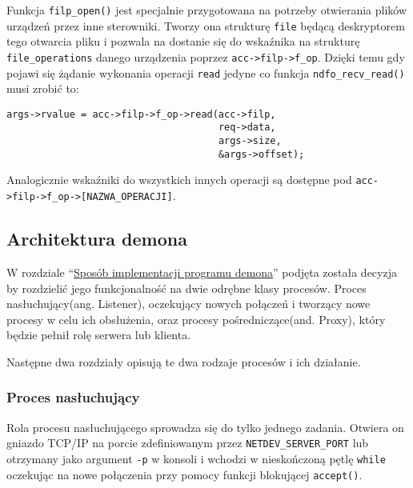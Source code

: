 \documentclass[10pt]{article}
\begin{document}
Funkcja \texttt{filp\_open()} jest specjalnie przygotowana na potrzeby otwierania plików urządzeń przez inne sterowniki. Tworzy ona strukturę \texttt{file} będącą deskryptorem tego otwarcia pliku i pozwala na dostanie się do wskaźnika na strukturę \texttt{file\_operations} danego urządzenia poprzez \texttt{acc-\textgreater{}filp-\textgreater{}f\_op}.  Dzięki temu gdy pojawi się żądanie wykonania operacji \texttt{read} jedyne co funkcja \texttt{ndfo\_recv\_read()} musi zrobić to:

\begin{verbatim}
args->rvalue = acc->filp->f_op->read(acc->filp,
                                     req->data,
                                     args->size,
                                     &args->offset);
\end{verbatim}

Analogicznie wskaźniki do wszystkich innych operacji są dostępne pod \texttt{acc-\textgreater{}filp-\textgreater{}f\_op-\textgreater{}{[}NAZWA\_OPERACJI{]}}.

\subsection{Architektura demona}

W rozdziale ``\hyperref[sposób-implementacji-programu-demona]{Sposób implementacji programu demona}'' podjęta została decyzja by rozdzielić jego funkcjonalność na dwie odrębne klasy procesów. Proces nasłuchujący(ang. Listener), oczekujący nowych połączeń i tworzący nowe procesy w celu ich obsłużenia, oraz procesy pośredniczące(and. Proxy), który będzie pełnił rolę serwera lub klienta.

Następne dwa rozdziały opisują te dwa rodzaje procesów i ich działanie.

\subsubsection{Proces nasłuchujący}

Rola procesu nasłuchującego sprowadza się do tylko jednego zadania.  Otwiera on gniazdo TCP/IP na porcie zdefiniowanym przez \texttt{NETDEV\_SERVER\_PORT} lub otrzymany jako argument \texttt{-p} w konsoli i wchodzi w nieskończoną pętlę \texttt{while} oczekując na nowe połączenia przy pomocy funkcji blokującej \texttt{accept()}.
\end{document}
